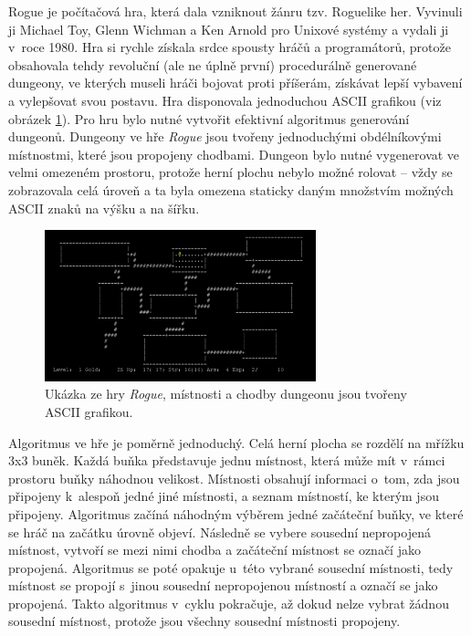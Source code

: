 Rogue je počítačová hra, která dala vzniknout žánru tzv. Roguelike her.
Vyvinuli ji Michael Toy, Glenn Wichman a Ken Arnold pro Unixové systémy a vydali ji v~roce 1980.
Hra si rychle získala srdce spousty hráčů a programátorů, protože obsahovala tehdy revoluční (ale ne úplně první) procedurálně generované dungeony, ve kterých museli hráči bojovat proti příšerám, získávat lepší vybavení a vylepšovat svou postavu.
Hra disponovala jednoduchou ASCII grafikou (viz obrázek \ref{img:rogue_gameplay}).
Pro hru bylo nutné vytvořit efektivní algoritmus generování dungeonů.
Dungeony ve hře \textit{Rogue} jsou tvořeny jednoduchými obdélníkovými místnostmi, které jsou propojeny chodbami.
Dungeon bylo nutné vygenerovat ve velmi omezeném prostoru, protože herní plochu nebylo možné rolovat -- vždy se zobrazovala celá úroveň a ta byla omezena staticky daným množstvím možných ASCII znaků na výšku a na šířku.
\begin{figure}[hbt]
    \centering
    \includegraphics[width=0.7\textwidth]{obrazky/rogue_gameplay.png}
    \caption{Ukázka ze hry \textit{Rogue}, místnosti a chodby dungeonu jsou tvořeny ASCII grafikou.}
    \label{img:rogue_gameplay}
\end{figure}
\par
Algoritmus ve hře je poměrně jednoduchý.
Celá herní plocha se rozdělí na mřížku 3x3 buněk.
Každá buňka představuje jednu místnost, která může mít v~rámci prostoru buňky náhodnou velikost.
Místnosti obsahují informaci o~tom, zda jsou připojeny k~alespoň jedné jiné místnosti, a seznam místností, ke kterým jsou připojeny.
Algoritmus začíná náhodným výběrem jedné začáteční buňky, ve které se hráč na začátku úrovně objeví.
Následně se vybere sousední nepropojená místnost, vytvoří se mezi nimi chodba a začáteční místnost se označí jako propojená.
Algoritmus se poté opakuje u~této vybrané sousední místnosti, tedy místnost se propojí s~jinou sousední nepropojenou místností a označí se jako propojená.
Takto algoritmus v~cyklu pokračuje, až dokud nelze vybrat žádnou sousední místnost, protože jsou všechny sousední místnosti propojeny.

